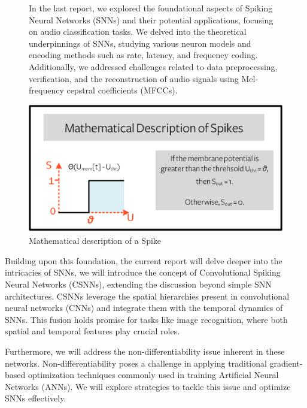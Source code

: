 \documentclass[11pt]{article}
\begin{document}
\begin{figure}[ht]
  \begin{minipage}[b]{0.45\textwidth}
    In the last report, we explored the foundational aspects of Spiking Neural Networks (SNNs) and their potential applications, focusing on audio classification tasks. We delved into the theoretical underpinnings of SNNs, studying various neuron models and encoding methods such as rate, latency, and frequency coding. Additionally, we addressed challenges related to data preprocessing, verification, and the reconstruction of audio signals using Mel-frequency cepstral coefficients (MFCCs).
  \end{minipage}
  \hfill
  \begin{minipage}[b]{0.5\textwidth}
    \centering
    \includegraphics[width=\textwidth]{./image/spike_description.png}
    \caption{Mathematical description of a Spike\cite{eshraghian2021training}}
    \label{fig:spike_description}
  \end{minipage}
\end{figure}

Building upon this foundation, the current report will delve deeper into the intricacies of SNNs, we will introduce the concept of Convolutional Spiking Neural Networks (CSNNs), extending the discussion beyond simple SNN architectures. CSNNs leverage the spatial hierarchies present in convolutional neural networks (CNNs) and integrate them with the temporal dynamics of SNNs. This fusion holds promise for tasks like image recognition, where both spatial and temporal features play crucial roles.

Furthermore, we will address the non-differentiability issue inherent in these networks. Non-differentiability poses a challenge in applying traditional gradient-based optimization techniques commonly used in training Artificial Neural Networks (ANNs). We will explore strategies to tackle this issue and optimize SNNs effectively.
\end{document}
